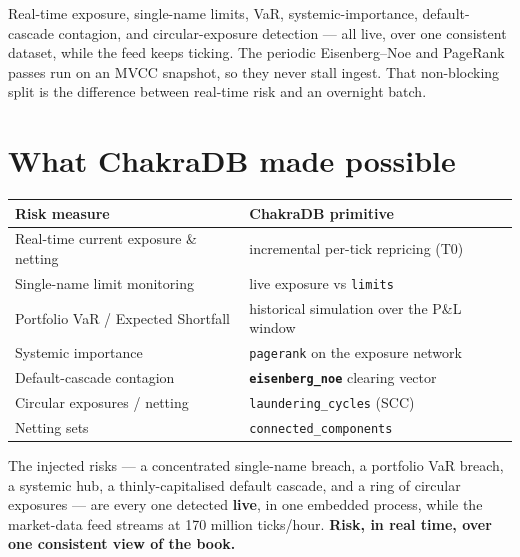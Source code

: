 \documentclass[
  11pt,
  openany]{book}
\begin{document}
Real-time exposure, single-name limits, VaR, systemic-importance,
default-cascade contagion, and circular-exposure detection --- all live,
over one consistent dataset, while the feed keeps ticking. The periodic
Eisenberg--Noe and PageRank passes run on an MVCC snapshot, so they
never stall ingest. That non-blocking split is the difference between
real-time risk and an overnight batch.

\section{What ChakraDB made
possible}\label{what-chakradb-made-possible-1}

\begin{longtable}[]{@{}
  >{\raggedright\arraybackslash}p{}
  >{\raggedright\arraybackslash}p{}@{}}
\toprule\noalign{}
\begin{minipage}[b]{\linewidth}\raggedright
Risk measure
\end{minipage} & \begin{minipage}[b]{\linewidth}\raggedright
ChakraDB primitive
\end{minipage} \\
\midrule\noalign{}
\endhead
\bottomrule\noalign{}
\endlastfoot
Real-time current exposure \& netting & incremental per-tick repricing
(T0) \\
Single-name limit monitoring & live exposure vs \texttt{limits} \\
Portfolio VaR / Expected Shortfall & historical simulation over the P\&L
window \\
Systemic importance & \texttt{pagerank} on the exposure network \\
Default-cascade contagion & \textbf{\texttt{eisenberg\_noe}} clearing
vector \\
Circular exposures / netting & \texttt{laundering\_cycles} (SCC) \\
Netting sets & \texttt{connected\_components} \\
\end{longtable}

The injected risks --- a concentrated single-name breach, a portfolio
VaR breach, a systemic hub, a thinly-capitalised default cascade, and a
ring of circular exposures --- are every one detected \textbf{live}, in
one embedded process, while the market-data feed streams at 170 million
ticks/hour. \textbf{Risk, in real time, over one consistent view of the
book.}
\end{document}
